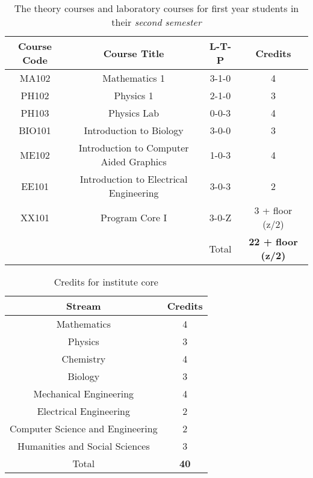 \begin{table}[t]
    \centering
    \begin{tabular}{c c c c}
        \toprule
        \textbf{Course Code} &  \textbf{Course Title} & \textbf{L-T-P} & \textbf{Credits} \\
        \midrule
        MA102   & Mathematics 1                             & 3-1-0 & 4 \\
        PH102   & Physics 1                                 & 2-1-0 & 3 \\
        PH103   & Physics Lab                               & 0-0-3 & 4 \\
        BIO101  & Introduction to Biology                   & 3-0-0 & 3 \\
        ME102   & Introduction to Computer Aided Graphics   & 1-0-3 & 4 \\
        EE101   & Introduction to Electrical Engineering    & 3-0-3 & 2 \\
        XX101   & Program Core I                            & 3-0-Z & 3 + floor (z/2) \\
        \midrule
        {}      & {}                                        & Total & \textbf{22 + floor (z/2)} \\
        \bottomrule
    \end{tabular}

    \caption{The theory courses and laboratory courses for first year students in their \textit{second semester}}
    \label{tab:second semester courses}
    
\end{table}

\begin{table}[b!]
    \centering
    \begin{tabular}{c c}
        \toprule
        \textbf{Stream}                     & \textbf{Credits} \\
        \midrule
        Mathematics                         & 4 \\
        Physics                             & 3 \\
        Chemistry                           & 4 \\
        Biology                             & 3 \\
        Mechanical Engineering              & 4 \\
        Electrical Engineering              & 2 \\
        Computer Science and Engineering    & 2 \\
        Humanities and Social Sciences      & 3\\
        \midrule
        Total & \textbf{40} \\
        \bottomrule
    \end{tabular}

    \caption{Credits for institute core}
    \label{tab:Credits for institute core}
    
\end{table}

